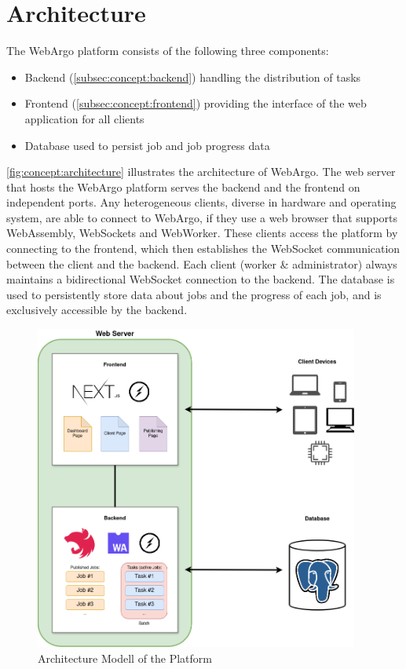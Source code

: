 \section{Architecture}
\label{sec:concept:architecture}
The WebArgo platform consists of the following three components:
\begin{itemize}
    \item Backend (\autoref{subsec:concept:backend}) handling the distribution of tasks
    \item Frontend (\autoref{subsec:concept:frontend}) providing the interface of the web application for all clients
    \item Database used to persist job and job progress data
\end{itemize}
\autoref{fig:concept:architecture} illustrates the architecture of WebArgo. The web server that hosts the WebArgo platform serves the backend and the frontend on independent ports. Any heterogeneous clients, diverse in hardware and operating system, are able to connect to WebArgo, if they use a web browser that supports WebAssembly, WebSockets and WebWorker. These clients access the platform by connecting to the frontend, which then establishes the WebSocket communication between the client and the backend. Each client (worker \& administrator) always maintains a bidirectional WebSocket connection to the backend. The database is used to persistently store data about jobs and the progress of each job, and is exclusively accessible by the backend.
\begin{figure}[htbp]
    \centering
    \includegraphics[width=0.95\textwidth]{gfx/figures/WebAssembly-MA.png}
    \caption{Architecture Modell of the Platform}
    \label{fig:concept:architecture}
\end{figure}

